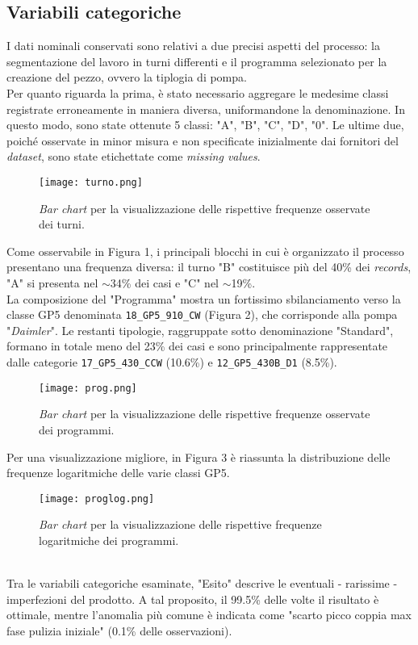 \documentclass[fleqn,10pt]{SelfArx} %
\begin{document}
\subsection{Variabili categoriche}
I dati nominali conservati sono relativi a due precisi aspetti del processo: la segmentazione del lavoro in turni differenti e il programma selezionato per la creazione del pezzo, ovvero la tiplogia di pompa.\\
Per quanto riguarda la prima, è stato necessario aggregare le medesime classi registrate erroneamente in maniera diversa, uniformandone la denominazione. In questo modo, sono state ottenute 5 classi: "A", "B", "C", "D", "0". Le ultime due, poiché osservate in minor misura e non specificate inizialmente dai fornitori del \textit{dataset}, sono state etichettate come \textit{missing values}.
\begin{figure}[h]
    \centering
    \texttt{[image: turno.png]}
    \label{fig:em}
    \caption{\textit{Bar chart} per la visualizzazione delle rispettive frequenze osservate dei turni.}
\end{figure}
Come osservabile in Figura 1, i principali blocchi in cui è organizzato il processo presentano una frequenza diversa: il turno "B" costituisce più del 40\% dei \textit{records}, "A" si presenta nel $\sim$34\% dei casi e "C" nel $\sim$19\%.\\
La composizione del "Programma" mostra un fortissimo sbilanciamento verso la classe GP5 denominata \texttt{18\_GP5\_910\_CW} (Figura 2), che corrisponde alla pompa "\textit{Daimler}". Le restanti tipologie, raggruppate sotto denominazione "Standard", formano in totale meno del 23\% dei casi e sono principalmente rappresentate dalle categorie \texttt{17\_GP5\_430\_CCW} (10.6\%) e \texttt{12\_GP5\_430B\_D1} (8.5\%).
\begin{figure}[h]
    \centering
    \texttt{[image: prog.png]}
    \label{fig:em}
    \caption{\textit{Bar chart} per la visualizzazione delle rispettive frequenze osservate dei programmi.}
\end{figure}
Per una visualizzazione migliore, in Figura 3 è riassunta la distribuzione delle frequenze logaritmiche delle varie classi GP5.
\begin{figure}[h]
    \centering
    \texttt{[image: proglog.png]}
    \label{fig:em}
    \caption{\textit{Bar chart} per la visualizzazione delle rispettive frequenze logaritmiche dei programmi.}
\end{figure}
\\
Tra le variabili categoriche esaminate, "Esito" descrive le eventuali - rarissime - imperfezioni del prodotto. A tal proposito, il 99.5\% delle volte il risultato è ottimale, mentre l'anomalia più comune è indicata come "scarto picco coppia max fase pulizia iniziale" (0.1\% delle osservazioni).
\end{document}
